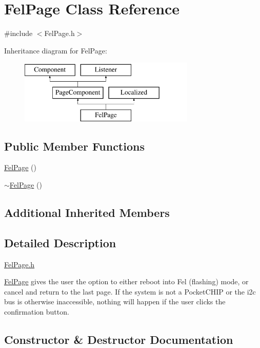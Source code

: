 \hypertarget{classFelPage}{}\section{Fel\+Page Class Reference}
\label{classFelPage}


{\ttfamily \#include $<$Fel\+Page.\+h$>$}

Inheritance diagram for Fel\+Page\+:\begin{figure}[H]
\begin{center}
\leavevmode
\includegraphics[height=3.000000cm]{classFelPage}
\end{center}
\end{figure}
\subsection*{Public Member Functions}
\begin{DoxyCompactItemize}
\item 
\mbox{\hyperlink{classFelPage_a4e955c4e82f245e227a1b029c610ac47}{Fel\+Page}} ()
\item 
\mbox{\hyperlink{classFelPage_abca2dc69df0593bf220248087fbfc493}{$\sim$\+Fel\+Page}} ()
\end{DoxyCompactItemize}
\subsection*{Additional Inherited Members}


\subsection{Detailed Description}
\mbox{\hyperlink{FelPage_8h}{Fel\+Page.\+h}}

\mbox{\hyperlink{classFelPage}{Fel\+Page}} gives the user the option to either reboot into Fel (flashing) mode, or cancel and return to the last page. If the system is not a Pocket\+C\+H\+IP or the i2c bus is otherwise inaccessible, nothing will happen if the user clicks the confirmation button. 

\subsection{Constructor \& Destructor Documentation}
\mbox{\label{classFelPage_a4e955c4e82f245e227a1b029c610ac47}} 
